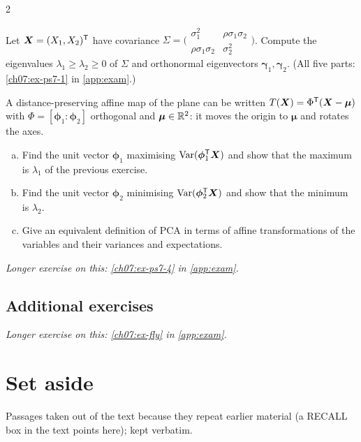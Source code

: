 \begin{paracol}{2}
\begin{exercise}\label{ch07:ex-ps7-1-short}
Let $\bm X=(X_1,X_2)^{\mathsf T}$ have covariance $\Sigma=\bigl(\begin{smallmatrix}\sigma_1^2&\rho\sigma_1\sigma_2\\ \rho\sigma_1\sigma_2&\sigma_2^2\end{smallmatrix}\bigr)$. Compute the eigenvalues $\lambda_1\ge\lambda_2\ge0$ of $\Sigma$ and orthonormal eigenvectors $\bm\gamma_1,\bm\gamma_2$. (All five parts: \cref{ch07:ex-ps7-1} in \cref{app:exam}.)
\end{exercise}

\begin{exercise}\label{ch07:ex-ps7-2}
A distance-preserving affine map of the plane can be written $T(\bm X)=\Phi^{\mathsf T}(\bm X-\bm\mu)$ with $\Phi=[\bm\phi_1:\bm\phi_2]$
orthogonal and $\bm\mu\in\mathbb{R}^2$: it moves the origin to $\bm\mu$ and rotates the axes.
\begin{enumerate}[(a)]
  \item Find the unit vector $\bm\phi_1$ maximising $\operatorname{Var}(\bm\phi_1^{\mathsf T}\bm X)$ and show that the maximum is $\lambda_1$ of the previous
      exercise.
  \item Find the unit vector $\bm\phi_2$ minimising $\operatorname{Var}(\bm\phi_2^{\mathsf T}\bm X)$ and show that the minimum is $\lambda_2$.
  \item Give an equivalent definition of PCA in terms of affine transformations of the variables and their
      variances and expectations.
\end{enumerate}
\end{exercise}

\noindent\emph{Longer exercise on this: \cref{ch07:ex-ps7-4} in \cref{app:exam}.}

\subsection*{Additional exercises}

\noindent\emph{Longer exercise on this: \cref{ch07:ex-fly} in \cref{app:exam}.}

\section*{Set aside}\label{ch07:sec-setaside}
Passages taken out of the text because they repeat earlier material (a RECALL box in the text points here); kept verbatim.


\end{paracol}
